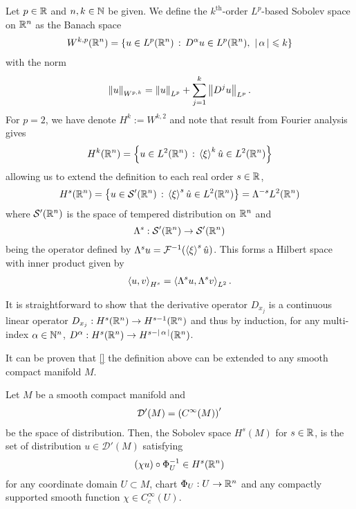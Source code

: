 \documentclass[12pt]{article}
\begin{document}
\begin{fdefinition} Let $p \in \R$ and $n, k \in \N$ be given. We define the $k^{\text{th}}$-order $L^p$-based Sobolev space on $\R^n$ as the Banach space
    \begin{align*}
    W^{k, p}(\R^n) = \set{u \in L^p(\R^n) \wh D^\alpha u \in L^p(\R^n), \, \, \abs{\alpha} \leq k }
    \end{align*}
    with the norm
    \begin{align*}
    \norm[u]_{W^{p, k}} = \norm[u]_{L^p} + \sum_{j = 1}^k \norm[D^j u]_{L^p}. 
    \end{align*}
    For $p = 2$, we have denote $H^k := W^{k ,2}$ and note that result from Fourier analysis gives
    \begin{align*}
    H^k(\R^n) = \set{u \in L^2(\R^n) \wh \abrac{\xi}^k \hat{u} \in L^2(\R^n)}
    \end{align*}
    allowing us to extend the definition to each real order $s \in \R$, 
    \begin{align*}
    H^s(\R^n) = \set{u \in \sch'(\R^n) \wh \abrac{\xi}^s \hat{u} \in L^2(\R^n)} = \Lambda^{-s} L^2(\R^n) 
    \end{align*}
    where $\sch'(\R^n)$ is the space of tempered distribution on $\R^n$ and 
    $$\Lambda^s: \sch'(\R^n) \to \sch'(\R^n)$$
     being the operator defined by $\Lambda^su = \F^{-1}(\abrac{\xi}^s \hat{u})$. This forms a Hilbert space with inner product given by
    \begin{align*}
    \inprod[u, v]_{H^s} = \inprod[ \Lambda^su, \Lambda^sv]_{L^2}. 
    \end{align*}
\end{fdefinition}
\begin{rem}
    It is straightforward to show that the derivative operator $D_{x_j}$ is a continuous linear operator $D_{x_j}: H^s(\R^n) \to H^{s - 1}(\R^n)$ and thus by induction, for any multi-index $\alpha \in \N^n$, $D^{\alpha} : H^s(\R^n) \to H^{s - \abs{\alpha}}(\R^n)$. 
\end{rem}

It can be proven that \ref{} the definition above can be extended to any smooth compact manifold $M$. 
\begin{fdefinition}
    Let $M$ be a smooth compact manifold and 
    \begin{align*}
    \mathcal{D}'(M) = \brac{C^\infty(M)}'
    \end{align*}
    be the space of distribution. Then, the Sobolev space $H^s(M)$ for $s \in \R$, is the set of distribution $u \in \mathcal{D}'(M)$ satisfying
    \begin{align*}
    (\chi u) \circ \Phi_U^{-1}  \in H^{s}(\R^n)
    \end{align*}
    for any coordinate domain $U \subset M$, chart $\Phi_U: U \to \R^n$ and any compactly supported smooth function $\chi \in C^\infty_c(U)$. 
\end{fdefinition}
\end{document}
